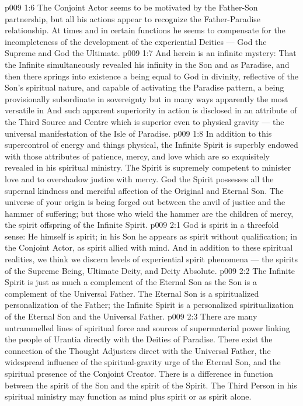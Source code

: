 \vs p009 1:6 The Conjoint Actor seems to be motivated by the Father\hyp{}Son partnership, but all his actions appear to recognize the Father\hyp{}Paradise relationship. At times and in certain functions he seems to compensate for the incompleteness of the development of the experiential Deities --- God the Supreme and God the Ultimate.
\vs p009 1:7 \pc And herein is an infinite mystery: That the Infinite simultaneously revealed his infinity in the Son and as Paradise, and then there springs into existence a being equal to God in divinity, reflective of the Son’s spiritual nature, and capable of activating the Paradise pattern, a being provisionally subordinate in sovereignty but in many ways apparently the most versatile in  And such apparent superiority in action is disclosed in an attribute of the Third Source and Centre which is superior even to physical gravity --- the universal manifestation of the Isle of Paradise.
\vs p009 1:8 In addition to this supercontrol of energy and things physical, the Infinite Spirit is superbly endowed with those attributes of patience, mercy, and love which are so exquisitely revealed in his spiritual ministry. The Spirit is supremely competent to minister love and to overshadow justice with mercy. God the Spirit possesses all the supernal kindness and merciful affection of the Original and Eternal Son. The universe of your origin is being forged out between the anvil of justice and the hammer of suffering; but those who wield the hammer are the children of mercy, the spirit offspring of the Infinite Spirit.
\vs p009 2:1 God is spirit in a threefold sense: He himself is spirit; in his Son he appears as spirit without qualification; in the Conjoint Actor, as spirit allied with mind. And in addition to these spiritual realities, we think we discern levels of experiential spirit phenomena --- the spirits of the Supreme Being, Ultimate Deity, and Deity Absolute.
\vs p009 2:2 The Infinite Spirit is just as much a complement of the Eternal Son as the Son is a complement of the Universal Father. The Eternal Son is a spiritualized personalization of the Father; the Infinite Spirit is a personalized spiritualization of the Eternal Son and the Universal Father.
\vs p009 2:3 There are many untrammelled lines of spiritual force and sources of supermaterial power linking the people of Urantia directly with the Deities of Paradise. There exist the connection of the Thought Adjusters direct with the Universal Father, the widespread influence of the spiritual\hyp{}gravity urge of the Eternal Son, and the spiritual presence of the Conjoint Creator. There is a difference in function between the spirit of the Son and the spirit of the Spirit. The Third Person in his spiritual ministry may function as mind plus spirit or as spirit alone.
